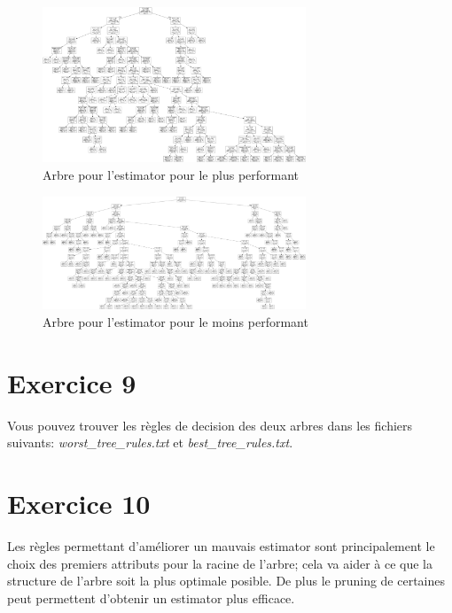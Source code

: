 \documentclass[a4paper, 12pt, oneside]{book}
\begin{document}
  \begin{figure}[H]
    \centering
    \includegraphics[width=0.7\textwidth]{images/best_tree}
    \caption{Arbre pour l'estimator pour le plus performant}
    \label{fig:intro-home}
  \end{figure}


  \begin{figure}[H]
    \centering
    \includegraphics[width=0.7\textwidth]{images/worst_tree}
    \caption{Arbre pour l'estimator pour le moins performant}
    \label{fig:intro-home}
  \end{figure}



\section{Exercice 9}
Vous pouvez trouver les règles de decision des deux arbres dans les fichiers suivants: \textit{worst\_tree\_rules.txt} et \textit{best\_tree\_rules.txt}.

\section{Exercice 10}
Les règles permettant d'améliorer un mauvais estimator sont principalement le choix des premiers attributs pour la racine de l'arbre; cela va aider à ce que la structure de l'arbre soit la plus optimale posible. De plus le pruning de certaines peut permettent d'obtenir un estimator plus efficace.



\end{document}
